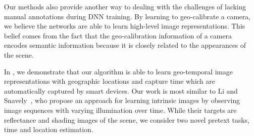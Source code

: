 

Our methods also provide another way to dealing with the challenges of
lacking manual annotations during DNN training. By learning to
geo-calibrate a camera, we believe the networks are able to learn
high-level image representations. This belief comes from the fact that
the geo-calibration information of a camera encodes semantic
information because it is closely related to the appearances of the
scene.


In , we demonstrate that our algorithm is able to
learn geo-temporal image representations with geographic locations and
capture time which are automatically captured by smart devices.
Our work is most similar to Li and Snavely~\cite{li2018learning},
who propose an approach for learning intrinsic images by observing
image sequences with varying illumination over time. While their
targets are reflectance and shading images of the scene, we consider
two novel pretext tasks, time and location estimation.


